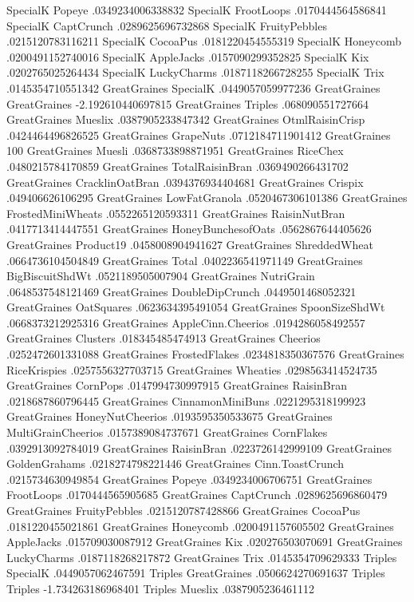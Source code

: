 SpecialK	Popeye	.0349234006338832
SpecialK	FrootLoops	.0170444564586841
SpecialK	CaptCrunch	.0289625696732868
SpecialK	FruityPebbles	.0215120783116211
SpecialK	CocoaPus	.0181220454555319
SpecialK	Honeycomb	.0200491152740016
SpecialK	AppleJacks	.0157090299352825
SpecialK	Kix	.0202765025264434
SpecialK	LuckyCharms	.0187118266728255
SpecialK	Trix	.0145354710551342
GreatGraines	SpecialK	.0449057059977236
GreatGraines	GreatGraines	-2.192610440697815
GreatGraines	Triples	.068090551727664
GreatGraines	Mueslix	.0387905233847342
GreatGraines	OtmlRaisinCrisp	.0424464496826525
GreatGraines	GrapeNuts	.0712184711901412
GreatGraines	100%
GreatGraines	Muesli	.0368733898871951
GreatGraines	RiceChex	.0480215784170859
GreatGraines	TotalRaisinBran	.0369490266431702
GreatGraines	CracklinOatBran	.0394376934404681
GreatGraines	Crispix	.049406626106295
GreatGraines	LowFatGranola	.0520467306101386
GreatGraines	FrostedMiniWheats	.0552265120593311
GreatGraines	RaisinNutBran	.0417713414447551
GreatGraines	HoneyBunchesofOats	.0562867644405626
GreatGraines	Product19	.0458008904941627
GreatGraines	ShreddedWheat	.0664736104504849
GreatGraines	Total	.0402236541971149
GreatGraines	BigBiscuitShdWt	.0521189505007904
GreatGraines	NutriGrain	.0648537548121469
GreatGraines	DoubleDipCrunch	.0449501468052321
GreatGraines	OatSquares	.0623634395491054
GreatGraines	SpoonSizeShdWt	.0668373212925316
GreatGraines	AppleCinn.Cheerios	.0194286058492557
GreatGraines	Clusters	.018345485474913
GreatGraines	Cheerios	.0252472601331088
GreatGraines	FrostedFlakes	.0234818350367576
GreatGraines	RiceKrispies	.0257556327703715
GreatGraines	Wheaties	.0298563414524735
GreatGraines	CornPops	.0147994730997915
GreatGraines	RaisinBran	.0218687860796445
GreatGraines	CinnamonMiniBuns	.0221295318199923
GreatGraines	HoneyNutCheerios	.0193595350533675
GreatGraines	MultiGrainCheerios	.0157389084737671
GreatGraines	CornFlakes	.0392913092784019
GreatGraines	RaisinBran	.0223726142999109
GreatGraines	GoldenGrahams	.0218274798221446
GreatGraines	Cinn.ToastCrunch	.0215734630949854
GreatGraines	Popeye	.0349234006706751
GreatGraines	FrootLoops	.0170444565905685
GreatGraines	CaptCrunch	.0289625696860479
GreatGraines	FruityPebbles	.0215120787428866
GreatGraines	CocoaPus	.0181220455021861
GreatGraines	Honeycomb	.0200491157605502
GreatGraines	AppleJacks	.015709030087912
GreatGraines	Kix	.020276503070691
GreatGraines	LuckyCharms	.0187118268217872
GreatGraines	Trix	.0145354709629333
Triples	SpecialK	.0449057062467591
Triples	GreatGraines	.0506624270691637
Triples	Triples	-1.734263186968401
Triples	Mueslix	.0387905236461112
